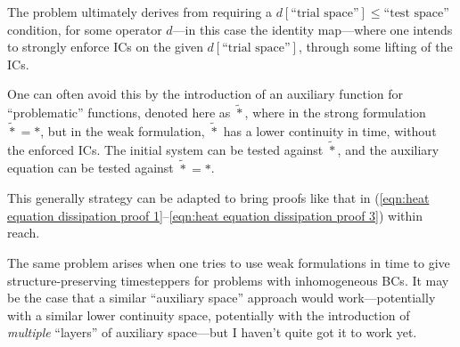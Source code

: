     The problem ultimately derives from requiring a $d[\text{``trial space''}]  \leqslant  \text{``test space''}$ condition, for some operator $d$---in this case the identity map---where one intends to strongly enforce ICs on the given $d[\text{``trial space''}]$, through some lifting of the ICs.

    One can often avoid this by the introduction of an auxiliary function for ``problematic'' functions, denoted here as $\widetilde{*}$, where in the strong formulation $\widetilde{*}  =  *$, but in the weak formulation, $\widetilde{*}$ has a lower continuity in time, without the enforced ICs. The initial system can be tested against $\widetilde{*}$, and the auxiliary equation can be tested against $\widetilde{*}  =  *$.

    This generally strategy can be adapted to bring proofs like that in (\ref{eqn:heat equation dissipation proof 1}--\ref{eqn:heat equation dissipation proof 3}) within reach.



    \begin{remark}
        The same problem arises when one tries to use weak formulations in time to give structure-preserving timesteppers for problems with inhomogeneous BCs. It may be the case that a similar ``auxiliary space'' approach would work---potentially with a similar lower continuity space, potentially with the introduction of \emph{multiple} ``layers'' of auxiliary space---but I haven't quite got it to work yet.
    \end{remark}

    